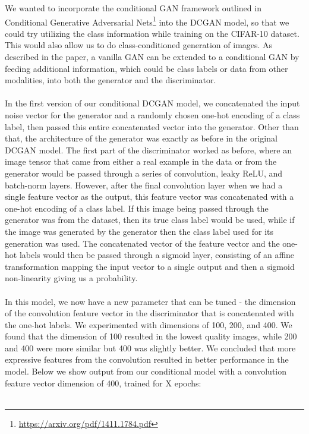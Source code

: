 \documentclass[a4paper]{article}
\begin{document}
We wanted to incorporate the conditional GAN framework outlined in Conditional Generative Adversarial Nets\footnote{\url{https://arxiv.org/pdf/1411.1784.pdf}} into the DCGAN model, so that we could try utilizing the class information while training on the CIFAR-10 dataset. This would also allow us to do class-conditioned generation of images. As described in the paper, a vanilla GAN can be extended to a conditional GAN by feeding additional information, which could be class labels or data from other modalities, into both the generator and the discriminator. 
\\\\
In the first version of our conditional DCGAN model, we concatenated the input noise vector for the generator and a randomly chosen one-hot encoding of a class label, then passed this entire concatenated vector into the generator. Other than that, the architecture of the generator was exactly as before in the original DCGAN model. The first part of the discriminator worked as before, where an image tensor that came from either a real example in the data or from the generator would be passed through a series of convolution, leaky ReLU, and batch-norm layers. However, after the final convolution layer when we had a single feature vector as the output, this feature vector was concatenated with a one-hot encoding of a class label. If this image being passed through the generator was from the dataset, then its true class label would be used, while if the image was generated by the generator then the class label used for its generation was used. The concatenated vector of the feature vector and the one-hot labels would then be passed through a sigmoid layer, consisting of an affine transformation mapping the input vector to a single output and then a sigmoid non-linearity giving us a probability. 
\\\\
In this model, we now have a new parameter that can be tuned - the dimension of the convolution feature vector in the discriminator that is concatenated with the one-hot labels. We experimented with dimensions of 100, 200, and 400. We found that the dimension of 100 resulted in the lowest quality images, while 200 and 400 were more similar but 400 was slightly better. We concluded that more expressive features from the convolution resulted in better performance in the model. Below we show output from our conditional model with a convolution feature vector dimension of 400, trained for X epochs:
\\\\
\end{document}
